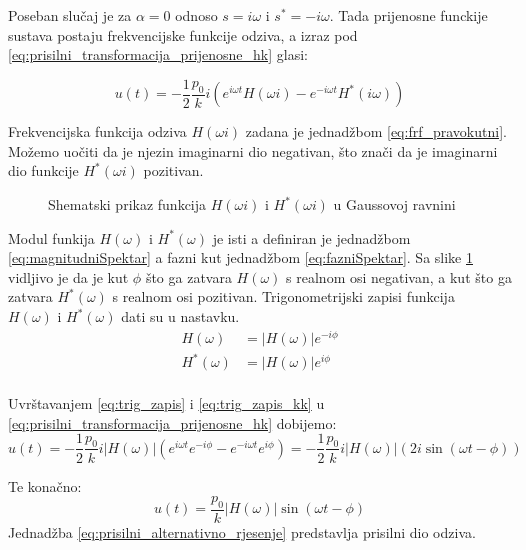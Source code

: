 Poseban slučaj je za $\alpha = 0$ odnoso $s=i\omega \text{ i } s^*=-i\omega$. Tada
prijenosne funckije sustava postaju frekvencijske funkcije odziva, a izraz pod
\eqref{eq:prisilni_transformacija_prijenosne_hk} glasi:

\begin{equation}\label{eq:prisilni_transformacija_frf}
    u(t) = -\frac{1}{2}\frac{p_0}{k}i(e^{i\omega t}H(\omega i) - e^{-i\omega t}H^*(i\omega))
\end{equation}

Frekvencijska funkcija odziva $H(\omega i)$ zadana je jednadžbom \eqref{eq:frf_pravokutni}.
Možemo uočiti da je njezin imaginarni dio negativan, što znači da je imaginarni dio
funkcije $H^*(\omega i)$ pozitivan.
\begin{figure}[H]
    
    \caption{Shematski prikaz funkcija $H(\omega i) \text{ i }H^*(\omega i)$ u
    Gaussovoj ravnini}
    \label{fig:frf-gauss}
\end{figure}

Modul funkija $H(\omega)$ i $H^*(\omega)$ je isti a definiran je jednadžbom
\eqref{eq:magnitudniSpektar} a fazni kut jednadžbom \eqref{eq:fazniSpektar}. Sa
slike \ref{fig:frf-gauss} vidljivo je da je kut $\phi$ što ga zatvara $H(\omega)$ s
realnom osi negativan, a kut što ga zatvara $H^*(\omega)$ s realnom osi pozitivan.
Trigonometrijski zapisi funkcija $H(\omega) \text{ i } H^*(\omega)$ dati su u
nastavku.
\begin{align}
    H(\omega) &= |H(\omega)|e^{-i\phi} \label{eq:trig_zapis}\\
    H^*(\omega) &= |H(\omega)|e^{i\phi} \label{eq:trik_zapis_hk}\\ %
\end{align}

Uvrštavanjem \eqref{eq:trig_zapis} i \eqref{eq:trig_zapis_kk} u \eqref{eq:prisilni_transformacija_prijenosne_hk}
dobijemo:
\begin{equation}
    u(t)=-\frac{1}{2}\frac{p_0}{k}i|H(\omega)|(e^{i\omega t}e^{-i\phi}-e^{-i\omega t}e^{i\phi})
        =-\frac{1}{2}\frac{p_0}{k}i|H(\omega)|(2i\sin(\omega t -\phi))
\end{equation}

Te konačno:
\begin{equation}\label{eq:prisilni_alternativno_rjesenje}
    u(t)=\frac{p_0}{k}|H(\omega)|\sin(\omega t - \phi)
\end{equation}
Jednadžba \eqref{eq:prisilni_alternativno_rjesenje} predstavlja prisilni dio odziva.

